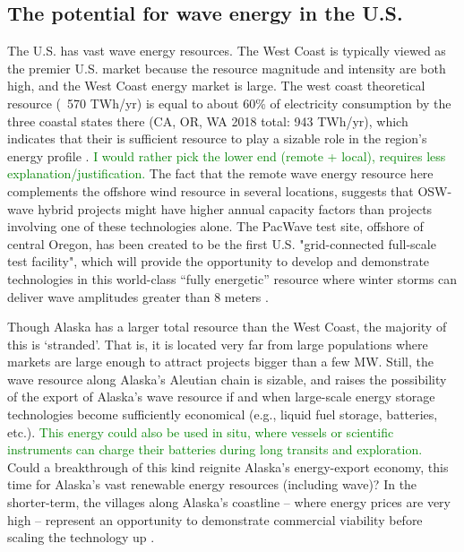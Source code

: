 \subsection{The potential for wave energy in the U.S.}


The U.S. has vast wave energy resources. The West Coast is typically viewed as the premier U.S. market because the resource magnitude and intensity are both high, and the West Coast energy market is large. The west coast theoretical resource (~570 TWh/yr) is equal to about 60\% of electricity consumption by the three coastal states there (CA, OR, WA 2018 total: 943 TWh/yr), which indicates that their is sufficient resource to play a sizable role in the region's energy profile \citep{energyinformationadministrationStateEnergyConsumption2020}.  
\textcolor{green}{I would rather pick the lower end (remote + local), requires less explanation/justification.}
The fact that the remote wave energy resource here complements the offshore wind resource in several locations, suggests that OSW-wave hybrid projects might have higher annual capacity factors than projects involving one of these technologies alone. The PacWave test site, offshore of central Oregon, has been created to be the first U.S. "grid-connected full-scale test facility", which will provide the opportunity to develop and demonstrate technologies in this world-class ``fully energetic'' resource where winter storms can deliver wave amplitudes greater than 8 meters \citep[e.g.][]{allan_climate_2006}.

Though Alaska has a larger total resource than the West Coast, the majority of this is `stranded'. That is, it is located very far from large populations where markets are large enough to attract projects bigger than a few MW. Still, the wave resource along Alaska's Aleutian chain is sizable, and raises the possibility of the export of Alaska's wave resource if and when large-scale energy storage technologies become sufficiently economical (e.g., liquid fuel storage, batteries, etc.). \textcolor{green}{This energy could also be used in situ, where vessels or scientific instruments can charge their batteries during long transits and exploration.} Could a breakthrough of this kind reignite Alaska's energy-export economy, this time for Alaska's vast renewable energy resources (including wave)? In the shorter-term, the villages along Alaska's coastline -- where energy prices are very high -- represent an opportunity to demonstrate commercial viability before scaling the technology up \cite{alaskaenergyauthority2019PowerCost2020}.

